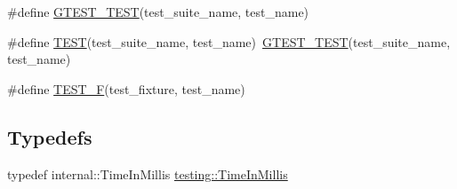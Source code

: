 \begin{DoxyCompactItemize}
\item 
\#define \mbox{\hyperlink{googletest-master_2googletest_2include_2gtest_2gtest_8h_a216a746d9241b1f42fdd4449698a4d8d}{G\+T\+E\+S\+T\+\_\+\+T\+E\+ST}}(test\+\_\+suite\+\_\+name,  test\+\_\+name)
\item 
\#define \mbox{\hyperlink{googletest-master_2googletest_2include_2gtest_2gtest_8h_ab5540a6d621853916be8240ff51819cf}{T\+E\+ST}}(test\+\_\+suite\+\_\+name,  test\+\_\+name)~\mbox{\hyperlink{_obj__test_2lib_2googletest-release-1_88_81_2googletest_2test_2gtest__unittest_8cc_a54247aeadc0617105812dca8609638de}{G\+T\+E\+S\+T\+\_\+\+T\+E\+ST}}(test\+\_\+suite\+\_\+name, test\+\_\+name)
\item 
\#define \mbox{\hyperlink{googletest-master_2googletest_2include_2gtest_2gtest_8h_a0ee66d464d1a06c20c1929cae09d8758}{T\+E\+S\+T\+\_\+F}}(test\+\_\+fixture,  test\+\_\+name)
\end{DoxyCompactItemize}
\subsection*{Typedefs}
\begin{DoxyCompactItemize}
\item 
typedef internal\+::\+Time\+In\+Millis \mbox{\hyperlink{namespacetesting_a992de1d091ce660f451d1e8b3ce30fd6}{testing\+::\+Time\+In\+Millis}}
\end{DoxyCompactItemize}
